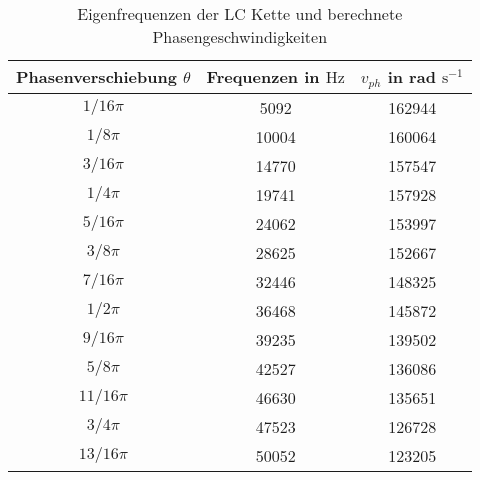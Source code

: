 \begin{table}
\centering
\caption{Eigenfrequenzen der LC Kette und berechnete Phasengeschwindigkeiten}
\label{tab: v_phase}
\begin{tabular}{S S S }
\toprule
{Phasenverschiebung $\theta$} & {Frequenzen in $\si{\hertz}$} & {$v_{ph}$ in rad $\si{\second^{-1}}$}  \\
\midrule
{${1}/{16}\pi$}  & 5092  & 162944\\
{${1}/{8}\pi$}  & 10004  & 160064\\
{${3}/{16}\pi$} & 14770  & 157547\\
{${1}/{4}\pi$}  & 19741  & 157928\\
{${5}/{16}\pi$}   & 24062  & 153997\\
{${3}/{8}\pi$}  & 28625  & 152667\\
{${7}/{16}\pi$} & 32446  & 148325\\
{${1}/{2}\pi$}  & 36468  & 145872\\
{${9}/{16}\pi$}  & 39235  & 139502\\
{${5}/{8}\pi$}  & 42527  & 136086\\
{${11}/{16}\pi$}  & 46630  & 135651\\
{${3}/{4}\pi$}  & 47523  & 126728\\
{${13}/{16}\pi$}  & 50052  & 123205\\
\bottomrule
\end{tabular}
\end{table}

